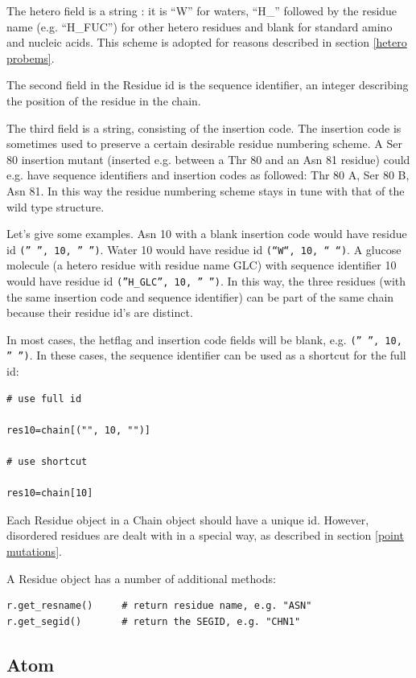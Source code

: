 \documentclass{report}
\begin{document}
The hetero field is a string : it is {}``W{}'' for waters, {}``H\_{}'' followed
by the residue name (e.g. {}``H\_FUC{}'') for other hetero residues and blank
for standard amino and nucleic acids. This scheme is adopted for reasons described
in section \ref{hetero probems}.

The second field in the Residue id is the sequence identifier, an integer describing
the position of the residue in the chain.

The third field is a string, consisting of the insertion code. The insertion
code is sometimes used to preserve a certain desirable residue numbering scheme.
A Ser 80 insertion mutant (inserted e.g. between a Thr 80 and an Asn 81 residue)
could e.g. have sequence identifiers and insertion codes as followed: Thr 80
A, Ser 80 B, Asn 81. In this way the residue numbering scheme stays in tune
with that of the wild type structure.

Let's give some examples. Asn 10 with a blank insertion code would have residue
id {\tt ('' '', 10, '' '')}. Water 10 would have residue id {\tt (``W``, 10, `` ``)}.
A glucose molecule (a hetero residue with residue name GLC) with sequence identifier
10 would have residue id {\tt (''H\_GLC'', 10, '' '')}. In this way, the three
residues (with the same insertion code and sequence identifier) can be part
of the same chain because their residue id's are distinct.

In most cases, the hetflag and insertion code fields will be blank, e.g. {\tt ('' '', 10, '' '')}.
In these cases, the sequence identifier can be used as a shortcut for the full
id:

\begin{verbatim}
# use full id

res10=chain[("", 10, "")]

# use shortcut

res10=chain[10]
\end{verbatim}

Each Residue object in a Chain object should have a unique id. However, disordered
residues are dealt with in a special way, as described in section \ref{point mutations}.

A Residue object has a number of additional methods:

\begin{verbatim}
r.get_resname()		# return residue name, e.g. "ASN"
r.get_segid()		# return the SEGID, e.g. "CHN1"
\end{verbatim}

\subsection{Atom}
\end{document}

